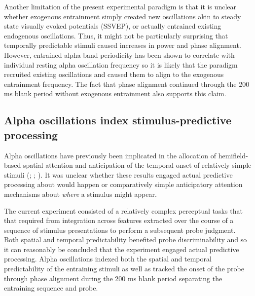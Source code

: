 \documentclass[dwyatte_dissertation.tex]{subfiles}
\begin{document}
Another limitation of the present experimental paradigm is that it is unclear whether exogenous entrainment simply created new oscillations akin to steady state visually evoked potentials (SSVEP), or actually entrained existing endogenous oscillations. Thus, it might not be particularly surprising that temporally predictable stimuli caused increases in power and phase alignment. However, entrained alpha-band periodicity has been shown to correlate with individual resting alpha oscillation frequency  so it is likely that the paradigm recruited existing oscillations and caused them to align to the exogenous entrainment frequency. The fact that phase alignment continued through the 200 ms blank period without exogenous entrainment also supports this claim.



\subsection{Alpha oscillations index stimulus-predictive processing}
Alpha oscillations have previously been implicated in the allocation of hemifield-based spatial attention and anticipation of the temporal onset of relatively simple stimuli (; ; ). It was unclear whether these results engaged actual predictive processing about  would happen or comparatively simple anticipatory attention mechanisms about \textit{where} a stimulus might appear. 

The current experiment consisted of a relatively complex perceptual tasks that that required from integration across features extracted over the course of a sequence of stimulus presentations to perform a subsequent probe judgment. Both spatial and temporal predictability benefited probe discriminability and so it can reasonably be concluded that the experiment engaged actual predictive processing. Alpha oscillations indexed both the spatial and temporal predictability of the entraining stimuli as well as tracked the onset of the probe through phase alignment during the 200 ms blank period separating the entraining sequence and probe.
\end{document}
